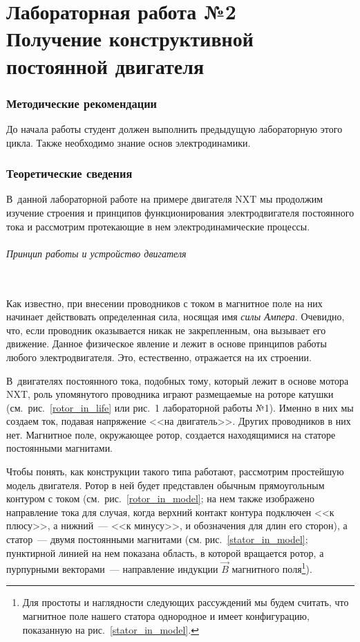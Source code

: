 \documentclass[12pt, a4paper, openany]{extarticle}
\begin{document}
\part*{Лабораторная работа №2\\
Получение конструктивной постоянной двигателя}

\section{Методические рекомендации}
\hspace*{\parindent}До начала работы студент должен выполнить предыдущую лабораторную этого цикла.
Также необходимо знание основ электродинамики.

\section{Теоретические сведения}
\hspace*{\parindent}В~данной лабораторной работе на примере двигателя NXT мы продолжим изучение строения и принципов функционирования электродвигателя постоянного тока и рассмотрим протекающие в нем электродинамические процессы.

\paragraph*{Принцип работы и устройство двигателя}$\phantom{-}$\\
\hspace*{\parindent}Как известно, при внесении проводников с током в магнитное поле на них начинает действовать определенная сила, носящая имя \textit{силы Ампера}. 
Очевидно, что, если проводник оказывается никак не закрепленным, она вызывает его движение. 
Данное физическое явление и лежит в основе принципов работы любого электродвигателя. 
Это, естественно, отражается на их строении.

В~двигателях постоянного тока, подобных тому, который лежит в основе мотора NXT, роль упомянутого проводника играют размещаемые на роторе катушки (см.~рис.~\ref{rotor_in_life} или рис.~1 лабораторной работы №1). 
Именно в них мы создаем ток, подавая напряжение <<на двигатель>>. 
Других проводников в них нет. 
Магнитное поле, окружающее ротор, создается находящимися на статоре постоянными магнитами. 

Чтобы понять, как конструкции такого типа работают, рассмотрим простейшую модель двигателя. 
Ротор в ней будет представлен обычным прямоугольным контуром с током (см.~рис.~\ref{rotor_in_model}; на нем также изображено направление тока для случая, когда верхний контакт контура подключен <<к плюсу>>, а нижний~--- <<к минусу>>, и обозначения для длин его сторон), а статор~--- двумя постоянными магнитами (см. рис.~\ref{stator_in_model}; пунктирной линией на нем показана область, в которой вращается ротор, а пурпурными векторами~--- направление индукции $\vec{B}$ магнитного поля\footnote{Для простоты и наглядности следующих рассуждений мы будем считать, что магнитное поле нашего статора однородное и имеет конфигурацию, показанную на рис.~\ref{stator_in_model}.}). 
\end{document}
